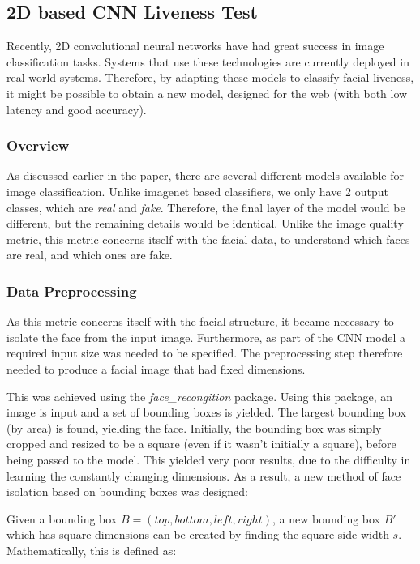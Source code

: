 \documentclass[11pt,a4paper]{article}
\begin{document}
            
        \subsection{2D based CNN Liveness Test}
        Recently, 2D convolutional neural networks have had great success in image classification tasks. Systems that use these technologies are currently deployed in real world systems.
        Therefore, by adapting these models to classify facial liveness, it might be possible to obtain a new model, designed for the web (with both low latency and good accuracy).
        
            \subsubsection{Overview}
                As discussed earlier in the paper, there are several different models available for image classification. Unlike imagenet based classifiers, we only have 2 output classes, which are \emph{real} and \emph{fake}.
                Therefore, the final layer of the model would be different, but the remaining details would be identical. Unlike the image quality metric, this metric concerns itself with the facial data, to understand which faces
                are real, and which ones are fake.

            \subsubsection{Data Preprocessing}
                As this metric concerns itself with the facial structure, it became necessary to isolate the face from the input image. Furthermore, as part of the CNN model a required input size was needed to be specified. 
                The preprocessing step therefore needed to produce a facial image that had fixed dimensions.

                This was achieved using the \emph{face\_recongition} package. Using this package, an image is input and a set of bounding boxes is yielded. The largest bounding box (by area) is found,
                yielding the face. Initially, the bounding box was simply cropped and resized to be a square (even if it wasn't initially a square), before being passed to the model. This yielded very poor results,
                due to the difficulty in learning the constantly changing dimensions. As a result, a new method of face isolation based on bounding boxes was designed:

                Given a bounding box $B = (top, bottom, left, right)$, a new bounding box $B'$ which has square dimensions can be created by finding the square
                side width $s$. Mathematically, this is defined as:
\end{document}
